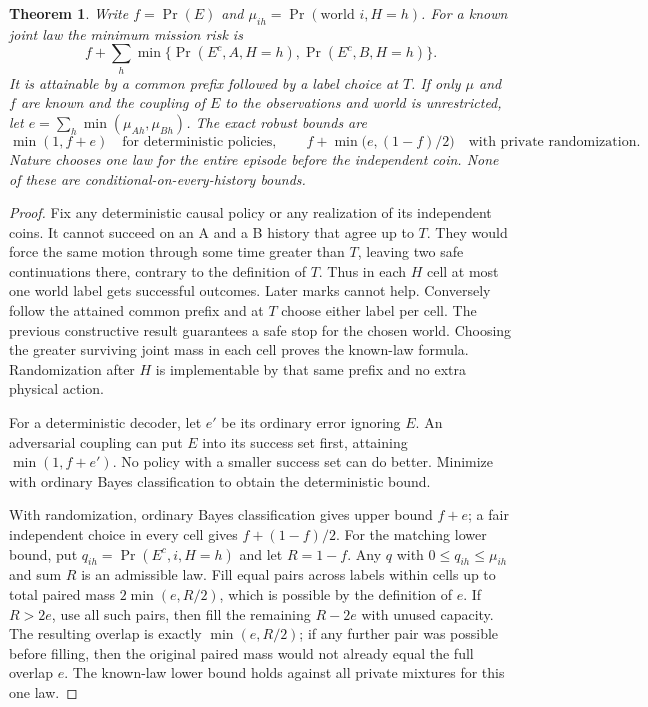 \documentclass[11pt]{article}
\newtheorem{theorem}{Theorem}
\begin{document}
\begin{theorem}
Write $f=\Pr(E)$ and $\mu_{ih}=\Pr(\text{world }i,H=h)$. For a known joint law the minimum mission risk is
\[
 f+\sum_h \min\{\Pr(E^c,A,H=h),\Pr(E^c,B,H=h)\}.
\]
It is attainable by a common prefix followed by a label choice at $T$. If only $\mu$ and $f$ are known and the coupling of $E$ to the observations and world is unrestricted, let $e=\sum_h\min(\mu_{Ah},\mu_{Bh})$. The exact robust bounds are
\[
 \min(1,f+e) \quad\text{for deterministic policies},\qquad
 f+\min\bigl(e,(1-f)/2\bigr) \quad\text{with private randomization}.
\]
Nature chooses one law for the entire episode before the independent coin. None of these are conditional-on-every-history bounds.
\end{theorem}

\begin{proof}
Fix any deterministic causal policy or any realization of its independent coins. It cannot succeed on an A and a B history that agree up to $T$. They would force the same motion through some time greater than $T$, leaving two safe continuations there, contrary to the definition of $T$. Thus in each $H$ cell at most one world label gets successful outcomes. Later marks cannot help. Conversely follow the attained common prefix and at $T$ choose either label per cell. The previous constructive result guarantees a safe stop for the chosen world. Choosing the greater surviving joint mass in each cell proves the known-law formula. Randomization after $H$ is implementable by that same prefix and no extra physical action.

For a deterministic decoder, let $e'$ be its ordinary error ignoring $E$. An adversarial coupling can put $E$ into its success set first, attaining $\min(1,f+e')$. No policy with a smaller success set can do better. Minimize with ordinary Bayes classification to obtain the deterministic bound.

With randomization, ordinary Bayes classification gives upper bound $f+e$; a fair independent choice in every cell gives $f+(1-f)/2$. For the matching lower bound, put $q_{ih}=\Pr(E^c,i,H=h)$ and let $R=1-f$. Any $q$ with $0\le q_{ih}\le\mu_{ih}$ and sum $R$ is an admissible law. Fill equal pairs across labels within cells up to total paired mass $2\min(e,R/2)$, which is possible by the definition of $e$. If $R>2e$, use all such pairs, then fill the remaining $R-2e$ with unused capacity. The resulting overlap is exactly $\min(e,R/2)$; if any further pair was possible before filling, then the original paired mass would not already equal the full overlap $e$. The known-law lower bound holds against all private mixtures for this one law.
\end{proof}
\end{document}
